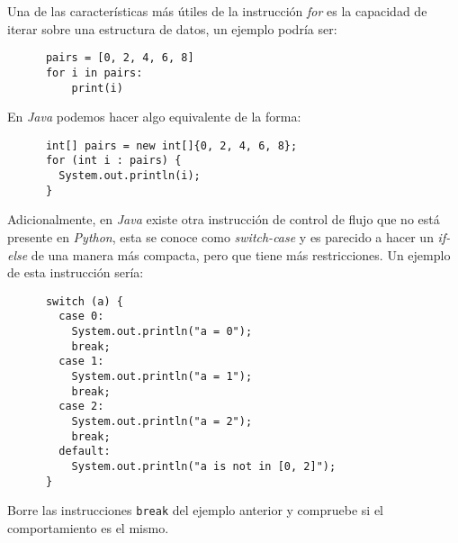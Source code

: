   Una de las características más útiles de la instrucción \textit{for} es la capacidad de
  iterar sobre una estructura de datos, un ejemplo podría ser:
  
  \begin{listing}[ht!]
    \begin{verbatim}
      pairs = [0, 2, 4, 6, 8]
      for i in pairs:
          print(i)
    \end{verbatim}    
  \end{listing}

  En \textit{Java} podemos hacer algo equivalente de la forma:

  \begin{listing}[ht!]
    \begin{verbatim}
      int[] pairs = new int[]{0, 2, 4, 6, 8};
      for (int i : pairs) {
        System.out.println(i);
      }
    \end{verbatim}
  \end{listing}

  
  Adicionalmente, en \textit{Java} existe otra instrucción de control de flujo que no está
  presente en \textit{Python}, esta se conoce como \textit{switch-case} y es parecido a 
  hacer un \textit{if-else} de una manera más compacta, pero que tiene más restricciones.
  Un ejemplo de esta instrucción sería:

  \begin{listing}[ht!]
    \begin{verbatim}
      switch (a) {
        case 0:
          System.out.println("a = 0");
          break;
        case 1:
          System.out.println("a = 1");
          break;
        case 2:
          System.out.println("a = 2");
          break;
        default:
          System.out.println("a is not in [0, 2]");
      }
    \end{verbatim}
  \end{listing}

  \begin{exercise}
    Borre las instrucciones \texttt{break} del ejemplo anterior y compruebe si 
    el comportamiento es el mismo.
  \end{exercise}
%